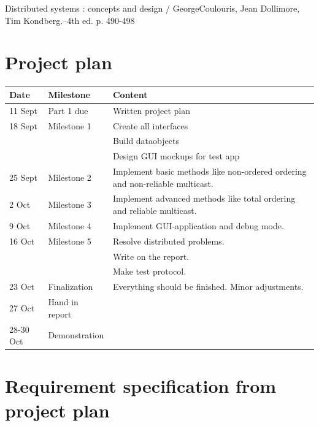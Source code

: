 \documentclass[english]{article}
\begin{document}
\begin{thebibliography}{5}
 Distributed systems : concepts and design / GeorgeCoulouris, Jean Dollimore, Tim Kondberg.--4th ed. p. 490-498

\end{thebibliography}

\appendix
\section{Project plan}
\label{app:projectplan}
\begin{tabular}{|l|l|p{7.5cm}|}
\hline
Date	&	Milestone	&	Content \\
\hline
11 Sept	&	Part 1 due	&	Written project plan \\
18 Sept &	Milestone 1 &	Create all interfaces \\ 
						&&	Build dataobjects \\
						&&	Design GUI mockups for test app \\
25 Sept &	Milestone 2 & 	Implement basic methods like non-ordered ordering and non-reliable multicast. \\
2 Oct	&	Milestone 3 & 	Implement advanced methods like total ordering and reliable multicast. \\
9 Oct	&	Milestone 4 & 	Implement GUI-application and debug mode. \\
16 Oct	&	Milestone 5 & 	Resolve distributed problems. \\ && Write on the report.\\ && Make test protocol. \\
23 Oct	&	Finalization 	& Everything should be finished. Minor adjustments. \\
27 Oct	&	Hand in report 	& \\
28-30 Oct & Demonstration	& \\
\hline
\end{tabular}

\appendix
\section{Requirement specification from project plan}
\label{app:reqspec}
\end{document}
